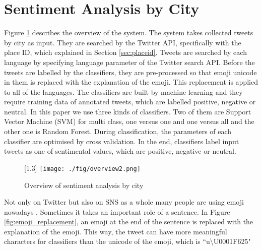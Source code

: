 \documentclass[twocolumn]{article}
\begin{document}
\vspace{-6mm}

\section{Sentiment Analysis by City}\label{sec:overview}
\vspace{-2mm}
Figure \ref{fig:overview} describes the overview of the system.
The system takes collected tweets by city as input.
They are searched by the Twitter API, specifically with the place ID, which explained in Section \ref{sec:placeid}.
Tweets are searched by each language by specifying language parameter of the Twitter search API.
Before the tweets are labelled by the classifiers, they are pre-processed so that emoji unicode in them is replaced with the explanation of the emoji.
This replacement is applied to all of the languages.
The classifiers are built by machine learning and they require training data of annotated tweets, which are labelled positive, negative or neutral.
In this paper we use three kinds of classifiers.
Two of them are Support Vector Machine (SVM) for multi class, one versus one and one versus all and the other one is Random Forest.
During classification, the parameters of each classifier are optimised by cross validation.
In the end, classifiers label input tweets as one of sentimental values, which are positive, negative or neutral.

\begin{figure}
	\centering
	\scalebox{1.2}[1.3]{
	\texttt{[image: ./fig/overview2.png]}
	}
	\caption{Overview of sentiment analysis by city}
	\label{fig:overview}
\end{figure}

Not only on Twitter but also on SNS as a whole many people are using emoji nowadays \cite{emoji}.
Sometimes it takes an important role of a sentence.
In Figure \ref{fig:emoji_replacement}, an emoji at the end of the sentence is replaced with the explanation of the emoji.
This way, the tweet can have more meaningful characters for classifiers than the unicode of the emoji, which is ``u\textbackslash U0001F625"
\end{document}
